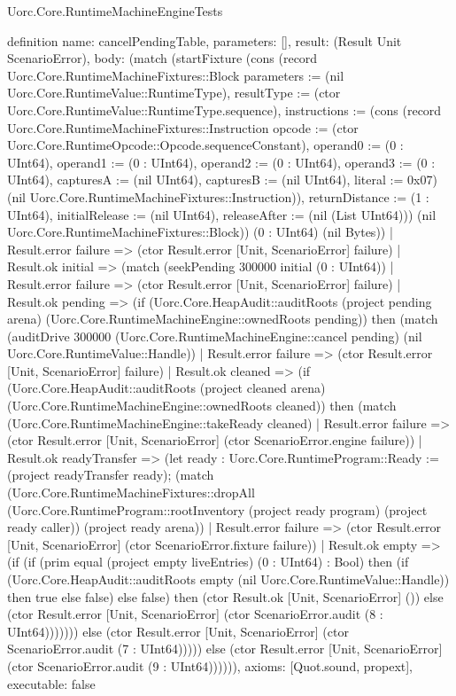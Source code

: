 \begin{lexlean}{Uorc.Core.RuntimeMachineEngineTests}
\begin{semanticmodule}
definition{
  name: cancelPendingTable,
  parameters: [],
  result: (Result Unit ScenarioError),
  body: (match (startFixture (cons (record Uorc.Core.RuntimeMachineFixtures::Block {parameters := (nil Uorc.Core.RuntimeValue::RuntimeType), resultType := (ctor Uorc.Core.RuntimeValue::RuntimeType.sequence), instructions := (cons (record Uorc.Core.RuntimeMachineFixtures::Instruction {opcode := (ctor Uorc.Core.RuntimeOpcode::Opcode.sequenceConstant), operand0 := (0 : UInt64), operand1 := (0 : UInt64), operand2 := (0 : UInt64), operand3 := (0 : UInt64), capturesA := (nil UInt64), capturesB := (nil UInt64), literal := 0x07}) (nil Uorc.Core.RuntimeMachineFixtures::Instruction)), returnDistance := (1 : UInt64), initialRelease := (nil UInt64), releaseAfter := (nil (List UInt64))}) (nil Uorc.Core.RuntimeMachineFixtures::Block)) (0 : UInt64) (nil Bytes))
    | Result.error failure => (ctor Result.error [Unit, ScenarioError] failure)
    | Result.ok initial => (match (seekPending 300000 initial (0 : UInt64))
      | Result.error failure => (ctor Result.error [Unit, ScenarioError] failure)
      | Result.ok pending => (if (Uorc.Core.HeapAudit::auditRoots (project pending arena) (Uorc.Core.RuntimeMachineEngine::ownedRoots pending)) then (match (auditDrive 300000 (Uorc.Core.RuntimeMachineEngine::cancel pending) (nil Uorc.Core.RuntimeValue::Handle))
        | Result.error failure => (ctor Result.error [Unit, ScenarioError] failure)
        | Result.ok cleaned => (if (Uorc.Core.HeapAudit::auditRoots (project cleaned arena) (Uorc.Core.RuntimeMachineEngine::ownedRoots cleaned)) then (match (Uorc.Core.RuntimeMachineEngine::takeReady cleaned)
          | Result.error failure => (ctor Result.error [Unit, ScenarioError] (ctor ScenarioError.engine failure))
          | Result.ok readyTransfer => (let ready : Uorc.Core.RuntimeProgram::Ready := (project readyTransfer ready); (match (Uorc.Core.RuntimeMachineFixtures::dropAll (Uorc.Core.RuntimeProgram::rootInventory (project ready program) (project ready caller)) (project ready arena))
            | Result.error failure => (ctor Result.error [Unit, ScenarioError] (ctor ScenarioError.fixture failure))
            | Result.ok empty => (if (if (prim equal (project empty liveEntries) (0 : UInt64) : Bool) then (if (Uorc.Core.HeapAudit::auditRoots empty (nil Uorc.Core.RuntimeValue::Handle)) then true else false) else false) then (ctor Result.ok [Unit, ScenarioError] ()) else (ctor Result.error [Unit, ScenarioError] (ctor ScenarioError.audit (8 : UInt64))))))) else (ctor Result.error [Unit, ScenarioError] (ctor ScenarioError.audit (7 : UInt64))))) else (ctor Result.error [Unit, ScenarioError] (ctor ScenarioError.audit (9 : UInt64)))))),
  axioms: [Quot.sound, propext],
  executable: false
}


\end{semanticmodule}
\end{lexlean}
